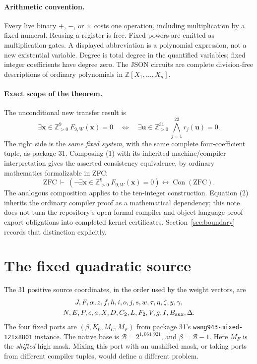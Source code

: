 \documentclass[11pt]{article}
\theoremstyle{definition}\newtheorem{definition}[theorem]{Definition}
\newcommand{\Z}{\mathbb Z}\newcommand{\N}{\mathbb N}\newcommand{\Pos}{\mathbb Z_{>0}}
\newcommand{\Con}{\operatorname{Con}(\mathrm{ZFC})}
\begin{document}
\paragraph{Arithmetic convention.}
Every live binary $+$, $-$, or $\times$ costs one operation, including
multiplication by a fixed numeral. Reusing a register is free. Fixed
powers are emitted as multiplication gates. A displayed abbreviation is
a polynomial expression, not a new existential variable. Degree is total
degree in the quantified variables; fixed integer coefficients have degree
zero. The JSON circuits are complete division-free descriptions of ordinary
polynomials in $\Z[X_1,\ldots,X_n]$.

\paragraph{Exact scope of the theorem.}
The unconditional new transfer result is
\[
  \exists\boldsymbol{x}\in\Pos^9\ F_{9,W}(\boldsymbol{x})=0
  \quad\Longleftrightarrow\quad
  \exists\boldsymbol{u}\in\Pos^{31}\
       \bigwedge_{j=1}^{22}r_j(\boldsymbol{u})=0.
  \tag{1}\label{eq:transfer}
\]
The right side is the \emph{same fixed system}, with the same complete
four-coefficient tuple, as package 31. Composing (1) with its inherited
machine/compiler interpretation gives the asserted consistency
equivalence, by ordinary mathematics formalizable in ZFC:
\[
 \mathrm{ZFC}\ \vdash\
 \left(\neg\exists\boldsymbol{x}\in\Pos^9\ F_{9,W}(\boldsymbol{x})=0\right)
 \longleftrightarrow\Con.
 \tag{2}\label{eq:zfc}
\]
The analogous composition applies to the ten-integer construction.
Equation (2) inherits the ordinary compiler proof as a mathematical
dependency; this note does not turn the repository's open formal
compiler and object-language proof-export obligations into completed
kernel certificates. Section~\ref{sec:boundary} records that distinction
explicitly.

\section{The fixed quadratic source}
\label{sec:parent}

The 31 positive source coordinates, in the order used by the weight
vectors, are
\[
\begin{gathered}
 J,F,\alpha,z,f,h,i,o,j,s,w,\tau,\eta,\zeta,y,\gamma,\\
 N,E,P,c,a,X,D,C_2,L,F_2,V,g,I,B_{\rm aux},\Delta.
\end{gathered}
\]
The four fixed ports are $(\beta,K_0,M_C,M_F)$ from package 31's
\texttt{wang943-mixed-121x8801} instance. The native base is
$\mathcal B=2^{1,064,921}$, and $\beta=\mathcal B-1$.
Here $M_F$ is the \emph{shifted} high mask. Mixing this port with an
unshifted mask, or taking ports from different compiler tuples, would
define a different problem.
\end{document}
